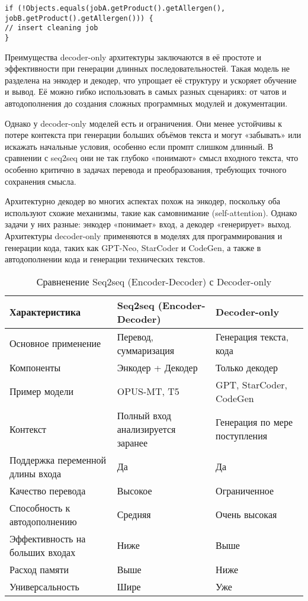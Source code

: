 \begin{lstlisting}[caption={Ответ, который модель может сгенерировать}, label={lst:model-answer}]
if (!Objects.equals(jobA.getProduct().getAllergen(), jobB.getProduct().getAllergen())) {
// insert cleaning job
}
\end{lstlisting}

Преимущества decoder-only архитектуры заключаются в её простоте и эффективности при генерации длинных последовательностей. Такая модель не разделена на энкодер и декодер, что упрощает её структуру и ускоряет обучение и вывод. Её можно гибко использовать в самых разных сценариях: от чатов и автодополнения до создания сложных программных модулей и документации.

Однако у decoder-only моделей есть и ограничения. Они менее устойчивы к потере контекста при генерации больших объёмов текста и могут «забывать» или искажать начальные условия, особенно если промпт слишком длинный. В сравнении с seq2seq они не так глубоко «понимают» смысл входного текста, что особенно критично в задачах перевода и преобразования, требующих точного сохранения смысла.

Архитектурно декодер во многих аспектах похож на энкодер, поскольку оба используют схожие механизмы, такие как самовнимание (self-attention). Однако задачи у них разные: энкодер «понимает» вход, а декодер «генерирует» выход. Архитектуры decoder-only применяются в моделях для программирования и генерации кода, таких как GPT-Neo, StarCoder и CodeGen, а также в автодополнении кода и генерации технических текстов.



\begin{table}[h]
\centering
\caption{Сравненение Seq2seq (Encoder-Decoder) с Decoder-only}
\begin{tabularx}{\textwidth}{|p{4cm}|p{4cm}|X|}
\hline
\textbf{Характеристика}         & \textbf{Seq2seq (Encoder-Decoder)} & \textbf{Decoder-only} \\
\hline
Основное применение             & Перевод, суммаризация & Генерация текста, кода \\
\hline
Компоненты                       & Энкодер + Декодер  & Только декодер \\
\hline
Пример модели                    & OPUS-MT, T5 & GPT, StarCoder, CodeGen \\
\hline
Контекст                         & Полный вход анализируется заранее & Генерация по мере поступления \\
\hline
Поддержка переменной длины входа & Да & Да \\
\hline
 Качество перевода               & Высокое & Ограниченное \\
\hline
 Способность к автодополнению    & Средняя & Очень высокая \\
\hline
 Эффективность на больших входах & Ниже & Выше \\
\hline
 Расход памяти                   & Выше & Ниже \\
\hline
 Универсальность                 & Шире & Уже \\
\hline
\end{tabularx}
\label{table:compareModels}
\end{table}

